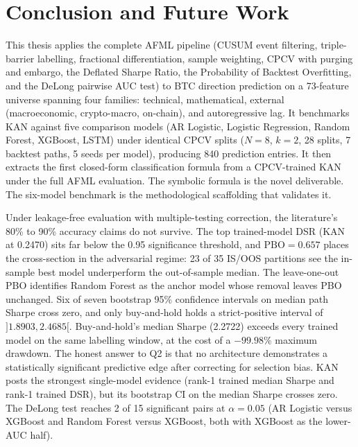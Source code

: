 \newpage
\section{Conclusion and Future Work}\label{sec:conclusion}

This thesis applies the complete AFML pipeline (CUSUM event filtering, triple-barrier labelling, fractional differentiation, sample weighting, CPCV with purging and embargo, the Deflated Sharpe Ratio, the Probability of Backtest Overfitting, and the DeLong pairwise AUC test) to BTC direction prediction on a 73-feature universe spanning four families: technical, mathematical, external (macroeconomic, crypto-macro, on-chain), and autoregressive lag. It benchmarks KAN against five comparison models (AR Logistic, Logistic Regression, Random Forest, XGBoost, LSTM) under identical CPCV splits ($N = 8$, $k = 2$, 28 splits, 7 backtest paths, 5 seeds per model), producing 840 prediction entries. It then extracts the first closed-form classification formula from a CPCV-trained KAN under the full AFML evaluation. The symbolic formula is the novel deliverable. The six-model benchmark is the methodological scaffolding that validates it.

Under leakage-free evaluation with multiple-testing correction, the literature's 80\% to 90\% accuracy claims do not survive. The top trained-model DSR (KAN at 0.2470) sits far below the 0.95 significance threshold, and $\text{PBO} = 0.657$ places the cross-section in the adversarial regime: 23 of 35 IS/OOS partitions see the in-sample best model underperform the out-of-sample median. The leave-one-out PBO identifies Random Forest as the anchor model whose removal leaves PBO unchanged. Six of seven bootstrap 95\% confidence intervals on median path Sharpe cross zero, and only buy-and-hold holds a strict-positive interval of $]1.8903, 2.4685[$. Buy-and-hold's median Sharpe (2.2722) exceeds every trained model on the same labelling window, at the cost of a $-99.98\%$ maximum drawdown. The honest answer to Q2 is that no architecture demonstrates a statistically significant predictive edge after correcting for selection bias. KAN posts the strongest single-model evidence (rank-1 trained median Sharpe and rank-1 trained DSR), but its bootstrap CI on the median Sharpe crosses zero. The DeLong test reaches 2 of 15 significant pairs at $\alpha = 0.05$ (AR Logistic versus XGBoost and Random Forest versus XGBoost, both with XGBoost as the lower-AUC half).


